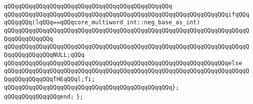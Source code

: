\verb|qQQqqQQqqQQqqQQqqQQqqQQqqQQqqQQqqQQqqQQqqQQqqQQq|\newline
\verb|qQQqqQQqqQQqqQQqqQQqqQQqqQQqqQQqqQQqqQQqqQQqqQQqqQQqqQQqqQQqqQQqifqQQqqQQqqQQq(lqQQq==qQQqcore_multiword_int::neg_base_as_int)|\newline
\verb|qQQqqQQqqQQqqQQqqQQqqQQqqQQqqQQqqQQqqQQqqQQqqQQqqQQqqQQqqQQqqQQqqQQqqQQqqQQqqQQqqQQq|\newline
\verb|qQQqqQQqqQQqqQQqqQQqqQQqqQQqqQQqqQQqqQQqqQQqqQQqqQQqqQQqqQQqqQQqqQQqqQQqqQQqqQQqqQQqNULL;qQQq|\newline
\verb|qQQqqQQqqQQqqQQqqQQqqQQqqQQqqQQqqQQqqQQqqQQqqQQqqQQqqQQqqQQqqQQqelse|\newline
\verb|qQQqqQQqqQQqqQQqqQQqqQQqqQQqqQQqqQQqqQQqqQQqqQQqqQQqqQQqqQQqqQQqqQQqqQQqqQQqqQQqqQQqTHEqQQql;fi;|\newline
\verb|qQQqqQQqqQQqqQQqqQQqqQQqqQQqqQQqqQQqqQQqqQQqqQQq};|\newline
\verb|qQQqqQQqqQQqqQQqend;|\newline
\verb|};|\newline
\newline

